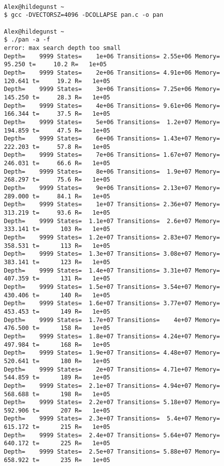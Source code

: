 \documentclass{llncs}
\begin{document}
\begin{lstlisting}[frame=single]

Alex@hildegunst ~
$ gcc -DVECTORSZ=4096 -DCOLLAPSE pan.c -o pan

Alex@hildegunst ~
$ ./pan -a -f
error: max search depth too small
Depth=    9999 States=    1e+06 Transitions= 2.55e+06 Memory=    95.250 t=     10.2 R=   1e+05
Depth=    9999 States=    2e+06 Transitions= 4.91e+06 Memory=   120.641 t=     19.2 R=   1e+05
Depth=    9999 States=    3e+06 Transitions= 7.25e+06 Memory=   145.250 t=     28.3 R=   1e+05
Depth=    9999 States=    4e+06 Transitions= 9.61e+06 Memory=   166.344 t=     37.5 R=   1e+05
Depth=    9999 States=    5e+06 Transitions=  1.2e+07 Memory=   194.859 t=     47.5 R=   1e+05
Depth=    9999 States=    6e+06 Transitions= 1.43e+07 Memory=   222.203 t=     57.8 R=   1e+05
Depth=    9999 States=    7e+06 Transitions= 1.67e+07 Memory=   246.031 t=     66.6 R=   1e+05
Depth=    9999 States=    8e+06 Transitions=  1.9e+07 Memory=   268.297 t=     75.6 R=   1e+05
Depth=    9999 States=    9e+06 Transitions= 2.13e+07 Memory=   289.000 t=     84.1 R=   1e+05
Depth=    9999 States=    1e+07 Transitions= 2.36e+07 Memory=   313.219 t=     93.6 R=   1e+05
Depth=    9999 States=  1.1e+07 Transitions=  2.6e+07 Memory=   333.141 t=      103 R=   1e+05
Depth=    9999 States=  1.2e+07 Transitions= 2.83e+07 Memory=   358.531 t=      113 R=   1e+05
Depth=    9999 States=  1.3e+07 Transitions= 3.08e+07 Memory=   383.141 t=      123 R=   1e+05
Depth=    9999 States=  1.4e+07 Transitions= 3.31e+07 Memory=   407.359 t=      131 R=   1e+05
Depth=    9999 States=  1.5e+07 Transitions= 3.54e+07 Memory=   430.406 t=      140 R=   1e+05
Depth=    9999 States=  1.6e+07 Transitions= 3.77e+07 Memory=   453.453 t=      149 R=   1e+05
Depth=    9999 States=  1.7e+07 Transitions=    4e+07 Memory=   476.500 t=      158 R=   1e+05
Depth=    9999 States=  1.8e+07 Transitions= 4.24e+07 Memory=   497.984 t=      168 R=   1e+05
Depth=    9999 States=  1.9e+07 Transitions= 4.48e+07 Memory=   520.641 t=      180 R=   1e+05
Depth=    9999 States=    2e+07 Transitions= 4.71e+07 Memory=   544.859 t=      189 R=   1e+05
Depth=    9999 States=  2.1e+07 Transitions= 4.94e+07 Memory=   568.688 t=      198 R=   1e+05
Depth=    9999 States=  2.2e+07 Transitions= 5.18e+07 Memory=   592.906 t=      207 R=   1e+05
Depth=    9999 States=  2.3e+07 Transitions=  5.4e+07 Memory=   615.172 t=      215 R=   1e+05
Depth=    9999 States=  2.4e+07 Transitions= 5.64e+07 Memory=   640.172 t=      225 R=   1e+05
Depth=    9999 States=  2.5e+07 Transitions= 5.88e+07 Memory=   658.922 t=      235 R=   1e+05

\end{lstlisting}
\end{document}
